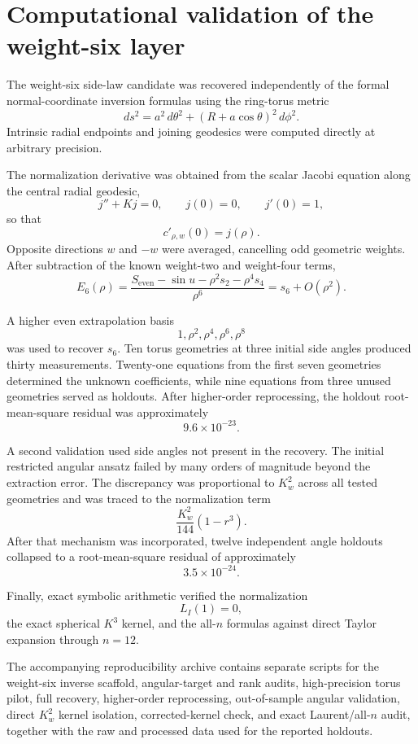 \documentclass[11pt]{article}
\theoremstyle{definition}
\theoremstyle{remark}
\begin{document}
\section{Computational validation of the weight-six layer}
\label{sec:verification}

The weight-six side-law candidate was recovered independently of the formal
normal-coordinate inversion formulas using the ring-torus metric
\[
ds^2=a^2\,d\theta^2+(R+a\cos\theta)^2\,d\phi^2.
\]
Intrinsic radial endpoints and joining geodesics were computed directly at
arbitrary precision.

The normalization derivative was obtained from the scalar Jacobi equation
along the central radial geodesic,
\[
j''+Kj=0,
\qquad j(0)=0,
\qquad j'(0)=1,
\]
so that
\[
c'_{\rho,w}(0)=j(\rho).
\]
Opposite directions \(w\) and \(-w\) were averaged, cancelling odd geometric
weights.  After subtraction of the known weight-two and weight-four terms,
\[
E_6(\rho)
=
\frac{S_{\mathrm{even}}-\sin u-\rho^2s_2-\rho^4s_4}{\rho^6}
=
s_6+O(\rho^2).
\]

A higher even extrapolation basis
\[
1,\rho^2,\rho^4,\rho^6,\rho^8
\]
was used to recover \(s_6\).  Ten torus geometries at three initial side
angles produced thirty measurements.  Twenty-one equations from the first
seven geometries determined the unknown coefficients, while nine equations
from three unused geometries served as holdouts.  After higher-order
reprocessing, the holdout root-mean-square residual was approximately
\[
9.6\times10^{-23}.
\]

A second validation used side angles not present in the recovery.  The
initial restricted angular ansatz failed by many orders of magnitude beyond
the extraction error.  The discrepancy was proportional to \(K_w^2\) across
all tested geometries and was traced to the normalization term
\[
\frac{K_w^2}{144}(1-r^3).
\]
After that mechanism was incorporated, twelve independent angle holdouts
collapsed to a root-mean-square residual of approximately
\[
3.5\times10^{-24}.
\]

Finally, exact symbolic arithmetic verified the normalization
\[
L_I(1)=0,
\]
the exact spherical \(K^3\) kernel, and the all-\(n\) formulas against direct
Taylor expansion through \(n=12\).

The accompanying reproducibility archive contains separate scripts for the
weight-six inverse scaffold, angular-target and rank audits, high-precision
torus pilot, full recovery, higher-order reprocessing, out-of-sample angular
validation, direct \(K_w^2\) kernel isolation, corrected-kernel check, and
exact Laurent/all-\(n\) audit, together with the raw and processed data used
for the reported holdouts.
\end{document}
